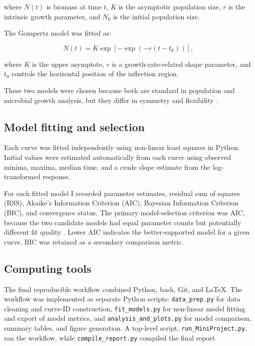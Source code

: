 \documentclass[11pt]{article}
\begin{document}
where $N(t)$ is biomass at time $t$, $K$ is the asymptotic population size, $r$ is the intrinsic growth parameter, and $N_0$ is the initial population size.

The Gompertz model was fitted as:

\begin{equation}
N(t) = K \exp\left[-\exp\left(-r(t-t_0)\right)\right],
\end{equation}

where $K$ is the upper asymptote, $r$ is a growth-rate-related shape parameter, and $t_0$ controls the horizontal position of the inflection region.

These two models were chosen because both are standard in population and microbial growth analysis, but they differ in symmetry and flexibility \citep{Zwietering1990}.

\subsection{Model fitting and selection}

Each curve was fitted independently using non-linear least squares in Python. Initial values were estimated automatically from each curve using observed minima, maxima, median time, and a crude slope estimate from the log-transformed response.

For each fitted model I recorded parameter estimates, residual sum of squares (RSS), Akaike's Information Criterion (AIC), Bayesian Information Criterion (BIC), and convergence status. The primary model-selection criterion was AIC, because the two candidate models had equal parameter counts but potentially different fit quality \citep{JohnsonOmland2004}. Lower AIC indicates the better-supported model for a given curve. BIC was retained as a secondary comparison metric.

\subsection{Computing tools}

The final reproducible workflow combined Python, bash, Git, and \LaTeX. The workflow was implemented as separate Python scripts: \texttt{data\_prep.py} for data cleaning and curve-ID construction, \texttt{fit\_models.py} for non-linear model fitting and export of model metrics, and \texttt{analysis\_and\_plots.py} for model comparison, summary tables, and figure generation. A top-level script, \texttt{run\_MiniProject.py}, ran the workflow, while \texttt{compile\_report.py} compiled the final report.
\end{document}
